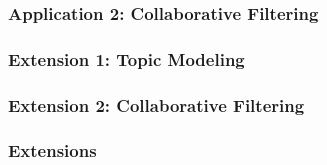 \documentclass[13pt]{beamer}
\begin{document}
\begin{frame}
\frametitle{Application 2: Collaborative Filtering}
\end{frame}
\begin{frame}
\frametitle{Extension 1: Topic Modeling}
\end{frame}
\begin{frame}
\frametitle{Extension 2: Collaborative Filtering}
\end{frame}
\begin{frame}
\frametitle{Extensions}
\end{frame}
 
\end{document}
